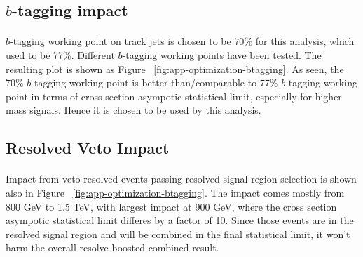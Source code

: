 \clearpage
\subsection{$b$-tagging impact}
\label{sec:app-optimization-btagging}
\paragraph{}
$b$-tagging working point on track jets is chosen to be $70\%$ for this analysis, which used to be 77\%. Different $b$-tagging working points have been tested. The resulting plot is shown as Figure ~\ref{fig:app-optimization-btagging}. As seen, the $70\%$ $b$-tagging working point is better than/comparable to 77\% $b$-tagging working point in terms of cross section asympotic statistical limit, especially for higher mass signals. Hence it is chosen to be used by this analysis.

\subsection{Resolved Veto Impact}
\label{sec:app-optimization-resveto}
\paragraph{}
Impact from veto resolved events passing resolved signal region selection is shown also in Figure ~\ref{fig:app-optimization-btagging}. The impact comes mostly from 800 GeV to 1.5 TeV, with largest impact at 900 GeV, where the cross section asympotic statistical limit differes by a factor of 10. Since those events are in the resolved signal region and will be combined in the final statistical limit, it won't harm the overall resolve-boosted combined result.

